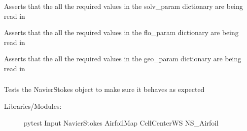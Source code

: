 \documentclass[letterpaper,10pt,english]{sphinxmanual}
\begin{document}
\begin{fulllineitems}
\label{\detokenize{autoapi/tests/test_Input/index:tests.test_Input.test_solv_param}}
\sphinxAtStartPar
Asserts that the all the required values in the
solv\_param dictionary are being read in

\end{fulllineitems}


\begin{fulllineitems}
\label{\detokenize{autoapi/tests/test_Input/index:tests.test_Input.test_flo_param}}
\sphinxAtStartPar
Asserts that the all the required values in the
flo\_param dictionary are being read in

\end{fulllineitems}


\begin{fulllineitems}
\label{\detokenize{autoapi/tests/test_Input/index:tests.test_Input.test_geo_param}}
\sphinxAtStartPar
Asserts that the all the required values in the
geo\_param dictionary are being read in

\end{fulllineitems}



\subsubsection{}
\label{\detokenize{autoapi/tests/test_NavierStokes/index:module-tests.test_NavierStokes}}\label{\detokenize{autoapi/tests/test_NavierStokes/index:tests-test-navierstokes}}\label{\detokenize{autoapi/tests/test_NavierStokes/index::doc}}
\sphinxAtStartPar
Tests the NavierStokes object to make sure it behaves as expected
\begin{description}
\item[{Libraries/Modules:}] \leavevmode
\sphinxAtStartPar
pytest
Input
NavierStokes
AirfoilMap
CellCenterWS
NS\_Airfoil

\end{description}
\end{document}
